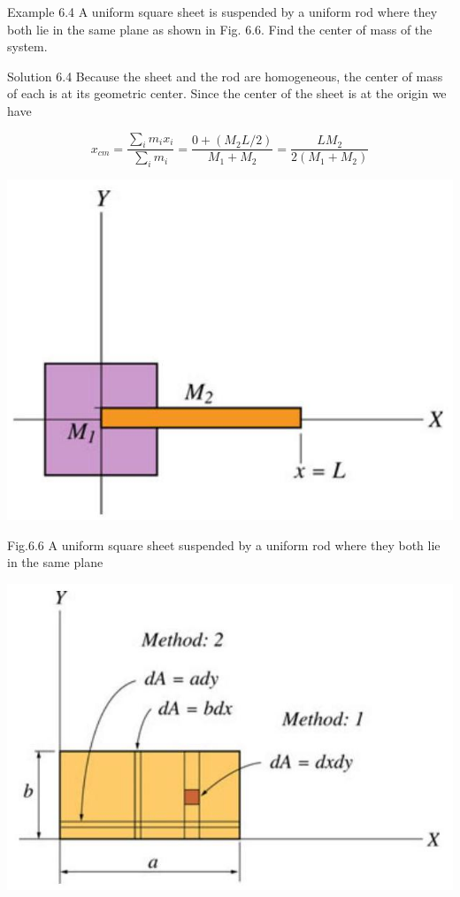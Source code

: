 \documentclass[10pt]{article}
\begin{document}
Example 6.4 A uniform square sheet is suspended by a uniform rod where they both lie in the same plane as shown in Fig. 6.6. Find the center of mass of the system.

Solution 6.4 Because the sheet and the rod are homogeneous, the center of mass of each is at its geometric center. Since the center of the sheet is at the origin we have

$$
x_{c m}=\frac{\sum_{i} m_{i} x_{i}}{\sum_{i} m_{i}}=\frac{0+\left(M_{2} L / 2\right)}{M_{1}+M_{2}}=\frac{L M_{2}}{2\left(M_{1}+M_{2}\right)}
$$

\begin{center}
\includegraphics[max width=\textwidth]{2024_09_13_db1f357d2aad0a03eb2eg-098(2)}
\end{center}

Fig.6.6 A uniform square sheet suspended by a uniform rod where they both lie in the same plane

\begin{center}
\includegraphics[max width=\textwidth]{2024_09_13_db1f357d2aad0a03eb2eg-098}
\end{center}
\end{document}
